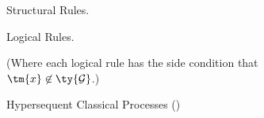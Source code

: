 \documentclass[submission,copyright,creativecommons]{eptcs}
\begin{document}
\begin{figure*}[!htb]
  Structural Rules.
  \begin{center} \hccpInfAx        \hccpInfCycle \end{center}
  \begin{center} \hccpInfMix       \hccpInfHalt  \end{center}

  Logical Rules.

  \begin{center} \hccpInfBoundTens \hccpInfParr  \end{center}
  \begin{center} \hccpInfOne       \hccpInfBot   \end{center}
  \begin{center}       \end{center}
  \begin{center} \hccpInfWith                    \end{center}
  \begin{center} \hccpInfNil       \hccpInfTop   \end{center}

  \centering
  (Where each logical rule has the side condition that $\tm{x} \not\in
  \ty{\mathcal{G}}$.)

  \caption{Hypersequent Classical Processes (\hcp)}
  \label{fig:hccp}
\end{figure*}
\end{document}
